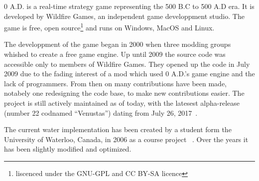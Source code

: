 0 A.D. is a real-time strategy game representing the 500 B.C to 500 A.D era. It
is developed by Wildfire Games, an independent game developpment studio. The
game is free, open source\footnote{liscenced under the GNU-GPL and CC BY-SA
licence} and runs on Windows, MacOS and Linux.

The developpment of the game began in 2000 when three modding groups whished to
create a free game engine. Up until 2009 the source code was accessible only to
members of Wildfire Games. They opened up the code in July 2009 due to the
fading interest of a mod which used 0 A.D.'s game engine and the lack of
programmers. From then on many contributions have been made, notabely one
redesigning the code base, to make new contributions easier. The project is
still actively maintained as of today, with the latesest alpha-release (number
22 codnamed ``Venustas'') dating from July 26,
2017~\autocite{wildfire0adproject,wildfire0adstory}.




The current water implementation has been created by a student form the
University of Waterloo, Canada, in 2006 as a course project
~\autocite{zaharia2006cs}. Over the years it has been slightly modified and
optimized. 
